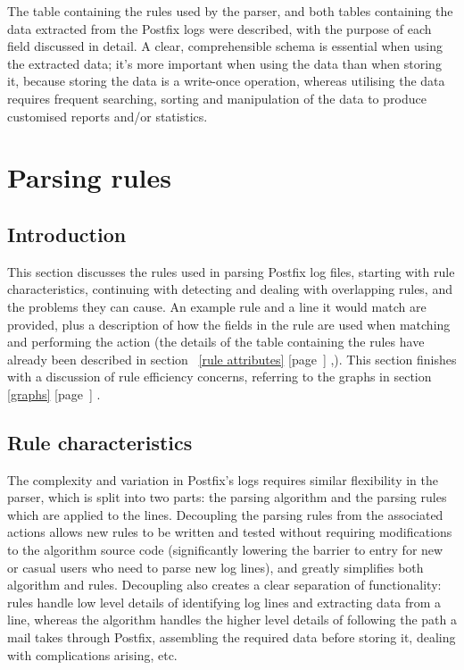 \documentclass[a4paper,12pt,draft]{article}
\newcommand{\refwithpage}[1]{%
    \empty{}\ref{#1} [page~\pageref{#1}]%
}
\begin{document}
The table containing the rules used by the parser, and both tables
containing the data extracted from the Postfix logs were described, with
the purpose of each field discussed in detail.  A clear, comprehensible
schema is essential when using the extracted data; it's more important when
using the data than when storing it, because storing the data is a
write-once operation, whereas utilising the data requires frequent
searching, sorting and manipulation of the data to produce customised
reports and/or statistics.

\section{Parsing rules}

\label{rules}

\subsection{Introduction}

This section discusses the rules used in parsing Postfix log files,
starting with rule characteristics, continuing with detecting and dealing
with overlapping rules, and the problems they can cause.  An example rule
and a line it would match are provided, plus a description of how the
fields in the rule are used when matching and performing the action (the
details of the table containing the rules have already been described in
section~\refwithpage{rule attributes},).  This section finishes with a
discussion of rule efficiency concerns, referring to the graphs in
section~\refwithpage{graphs}.


\subsection{Rule characteristics}

\label{rule characteristics}

The complexity and variation in Postfix's logs requires similar flexibility
in the parser, which is split into two parts: the parsing algorithm and the
parsing rules which are applied to the lines.  Decoupling the parsing rules
from the associated actions allows new rules to be written and tested
without requiring modifications to the algorithm source code (significantly
lowering the barrier to entry for new or casual users who need to parse new
log lines), and greatly simplifies both algorithm and rules.  Decoupling
also creates a clear separation of functionality: rules handle low level
details of identifying log lines and extracting data from a line, whereas
the algorithm handles the higher level details of following the path a mail
takes through Postfix, assembling the required data before storing it,
dealing with complications arising, etc.
\end{document}
